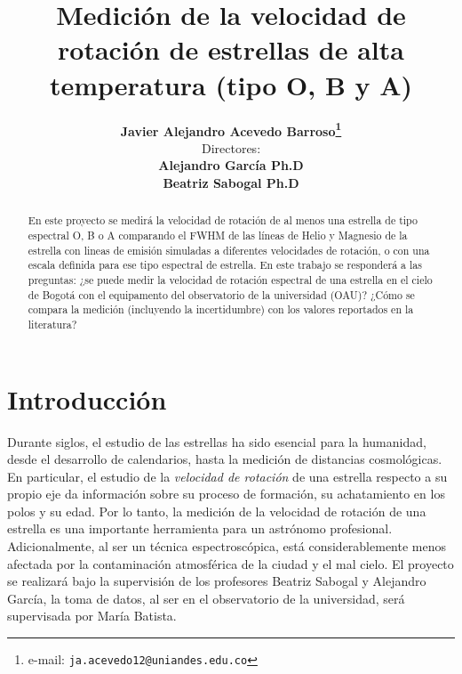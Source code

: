 \documentclass[notitlepage,letterpaper,12pt]{article} %
\begin{document}
\title{Medición de la velocidad de rotación de estrellas de alta temperatura (tipo O, B y A)}
\author{
\textbf{Javier Alejandro Acevedo Barroso\thanks{e-mail: \texttt{ja.acevedo12@uniandes.edu.co}}}\vspace{2mm} \\
Directores:\\
\textbf{Alejandro García Ph.D}\\
\textbf{Beatriz Sabogal Ph.D}
} %

\maketitle %


\vspace{-6mm}
\begin{abstract}
En este proyecto se medirá la velocidad de rotación de al menos una estrella de tipo espectral O, B o A comparando el FWHM de las líneas de Helio y Magnesio de la estrella con lineas de emisión simuladas a diferentes velocidades de rotación, o con una escala definida para ese tipo espectral de estrella. En este trabajo se responderá a las preguntas: ¿se puede medir la velocidad de rotación espectral de una estrella en el cielo de Bogotá con el equipamento del observatorio de la universidad (OAU)? ¿Cómo se compara la medición (incluyendo la incertidumbre) con los valores reportados en la literatura?
\end{abstract} 
\section{Introducción} 
Durante siglos, el estudio de las estrellas ha sido esencial para la humanidad, desde el desarrollo de calendarios, hasta la medición de distancias cosmológicas. En particular, el estudio de la \emph{velocidad de rotación} de una estrella respecto a su propio eje da información sobre su proceso de formación, su achatamiento en los polos y su edad. Por lo tanto, la medición de la velocidad de rotación de una estrella es una importante herramienta para un astrónomo profesional. Adicionalmente, al ser un técnica espectroscópica, está considerablemente menos afectada por la contaminación atmosférica de la ciudad y el mal cielo. El proyecto se realizará bajo la supervisión de los profesores Beatriz Sabogal y Alejandro García, la toma de datos, al ser en el observatorio de la universidad, será supervisada por María Batista. 
\end{document}
